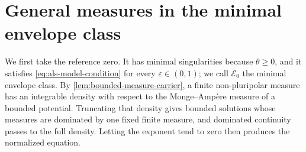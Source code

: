 \section{General measures in the minimal envelope class}
\label{sec:general-measure-minimal}

We first take the reference zero. It has minimal singularities because $\theta\geq0$, and it satisfies \eqref{eq:als-model-condition} for every $\varepsilon\in(0,1)$; we call $\mathcal E_0$ the minimal envelope class. By \cref{lem:bounded-measure-carrier}, a finite non-pluripolar measure has an integrable density with respect to the Monge--Amp\`ere measure of a bounded potential. Truncating that density gives bounded solutions whose measures are dominated by one fixed finite measure, and dominated continuity passes to the full density. Letting the exponent tend to zero then produces the normalized equation.


